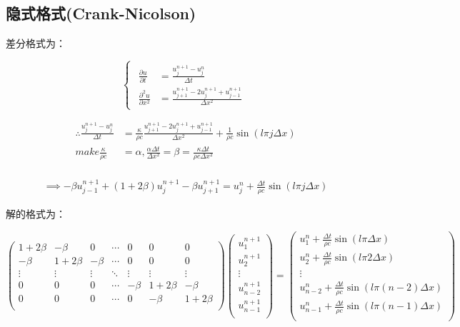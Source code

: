 \documentclass[
	20pt%
]{SUSTechHomework}
\begin{document}
\subsection{隐式格式(Crank-Nicolson)}
\qquad 差分格式为：

$$
\left\{ 
    \begin{array}{c}
        \begin{aligned}
        \frac{\partial u}{\partial t} &= \frac{u^{n+1}_j-u^n_j}{\Delta t}\\
        \frac{\partial^2 u}{\partial x^2} &= \frac{u^{n+1}_{j+1}-2u^{n+1}_j+u^{n+1}_{j-1}}{\Delta x^2}
        \end{aligned}
    \end{array}
\right.
$$

$$
\begin{aligned}
\therefore \frac{u^{n+1}_j-u^n_j}{\Delta t} &= \frac{\kappa}{\rho c} \frac{u^{n+1}_{j+1}-2u^{n+1}_j+u^{n+1}_{j-1}}{\Delta x^2} + \frac{1}{\rho c}\sin(l \pi j \Delta x)\\
make  \frac{\kappa}{\rho c} &= \alpha, \frac{\alpha \Delta t}{\Delta x^2} = \beta = \frac{\kappa \Delta t}{\rho c \Delta x^2}\\
\end{aligned}
$$

$$
\begin{aligned}
\implies -\beta u^{n+1}_{j-1} + (1+2\beta)u^{n+1}_j - \beta u^{n+1}_{j+1} = u^n_j + \frac{\Delta t}{\rho c} \sin(l \pi j \Delta x)
\end{aligned}
$$

\qquad 解的格式为：

$$
\begin{pmatrix}
    1+2 \beta & -\beta & 0 & \cdots & 0 & 0 & 0\\
    -\beta & 1+2 \beta & -\beta & \cdots & 0 & 0 & 0\\
    \vdots & \vdots & \vdots & \ddots & \vdots & \vdots & \vdots\\
    0 & 0 & 0 & \cdots & -\beta & 1+2\beta & -\beta\\
    0 & 0 & 0 & \cdots & 0 & -\beta & 1+2\beta\\
\end{pmatrix}
\begin{pmatrix}
    u^{n+1}_1  \\
    u^{n+1}_2 \\
    \vdots\\
    u^{n+1}_{n-2}\\
    u^{n+1}_{n-1}\\
\end{pmatrix}=
\begin{pmatrix}
    u^{n}_1 + \frac{\Delta t}{\rho c} \sin(l \pi \Delta x) \\
    u^{n}_2 + \frac{\Delta t}{\rho c} \sin(l \pi 2 \Delta x)\\
    \vdots\\
    u^{n}_{n-2} + \frac{\Delta t}{\rho c} \sin(l \pi (n-2) \Delta x)\\
    u^{n}_{n-1} + \frac{\Delta t}{\rho c} \sin(l \pi (n-1) \Delta x)\\
\end{pmatrix}
$$
\end{document}

